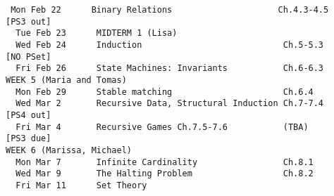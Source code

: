 \documentclass[quiz]{mcs}
\begin{document}

\begin{staffnotes}

\begin{verbatim}
 Mon Feb 22      Binary Relations                     Ch.4.3-4.5           [PS3 out]
  Tue Feb 23      MIDTERM 1 (Lisa)
  Wed Feb 24      Induction                            Ch.5-5.3             [NO PSet]
  Fri Feb 26      State Machines: Invariants           Ch.6-6.3
WEEK 5 (Maria and Tomas)
  Mon Feb 29      Stable matching                      Ch.6.4
  Wed Mar 2       Recursive Data, Structural Induction Ch.7-7.4             [PS4 out]
  Fri Mar 4       Recursive Games Ch.7.5-7.6           (TBA)                [PS3 due]
WEEK 6 (Marissa, Michael)
  Mon Mar 7       Infinite Cardinality                 Ch.8.1
  Wed Mar 9       The Halting Problem                  Ch.8.2
  Fri Mar 11      Set Theory     
\end{verbatim}
\end{staffnotes}



%





\examspace


\examspace




\examspace




\end{document}
